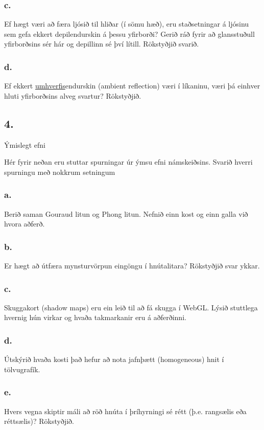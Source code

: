 \documentclass{article}
\begin{document}
\subsubsection{c.}Ef hægt væri að færa ljósið til hliðar (í sömu hæð), eru staðsetningar á ljósinu
sem gefa ekkert depilendurskin á þessu yfirborði? Gerið ráð fyrir að
glansstuðull yfirborðsins sér hár og depillinn sé því lítill. Rökstyðjið svarið.

\subsubsection{d.}Ef ekkert \underline{umhverfis}endurskin (ambient reflection) væri í líkaninu, væri þá
einhver hluti yfirborðsins alveg svartur? Rökstyðjið.

\newpage

\subsection{4.} Ýmislegt efni

Hér fyrir neðan eru stuttar spurningar úr ýmsu efni námskeiðsins. Svarið hverri
spurningu með nokkrum setningum

\subsubsection{a.}Berið saman Gouraud litun og Phong litun. Nefnið einn kost og einn galla
við hvora aðferð.

\subsubsection{b.}Er hægt að útfæra mynsturvörpun eingöngu í hnútalitara? Rökstyðjið svar
ykkar.

\subsubsection{c.}Skuggakort (shadow maps) eru ein leið til að fá skugga í WebGL. Lýsið
stuttlega hvernig hún virkar og hvaða takmarkanir eru á aðferðinni.

\subsubsection{d.}Útskýrið hvaða kosti það hefur að nota jafnþætt (homogeneous) hnit í
tölvugrafík.

\subsubsection{e.}Hvers vegna skiptir máli að röð hnúta í þríhyrningi sé rétt (þ.e. rangsælis eða
réttsælis)? Rökstyðjið.
\end{document}
